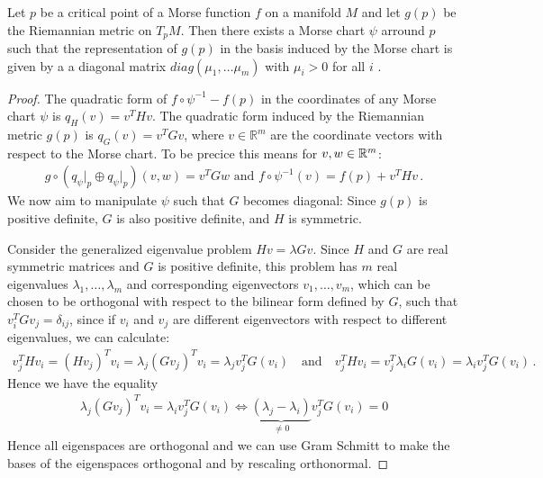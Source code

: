 \begin{theorem}
	Let $p$ be a critical point of a Morse function $f$ on a manifold $M$ and let $g(p)$ be the Riemannian metric on $T_pM$. Then there exists a Morse chart $\psi$ arround $p$ such that the representation of $g(p)$ in the basis induced by the Morse chart is given by a a diagonal matrix $diag(\mu_1,\dots \mu_m)$ with $\mu_i>0$ for all $i$ .
\end{theorem}
\begin{proof}
	The quadratic form of $f \circ \psi^{-1} - f(p)$ in the coordinates of any Morse chart $\psi$ is $q_H(v) = v^T H v$. The quadratic form induced by the Riemannian metric $g(p)$ is $q_G(v) = v^T G v$, where $v \in \mathbb{R}^m$ are the coordinate vectors with respect to the Morse chart. 
	To be precice this means for $v,w\in \mathbb{R}^m$:
	\begin{align*}
		g\circ ( q_{\psi}\big|_p\oplus q_{\psi}\big|_p ) (v,w)=v^TG w \text{ and } f\circ \psi^{-1} (v)=f(p)+v^T H v \, .
	\end{align*} We now aim to manipulate $\psi$ such that $G$ becomes diagonal:
	Since $g(p)$ is positive definite, $G$ is also positive definite, and $H$ is symmetric.
	
	Consider the generalized eigenvalue problem $Hv = \lambda G v$. Since $H$ and $G$ are real symmetric matrices and $G$ is positive definite, this problem has $m$ real eigenvalues $\lambda_1, \dots, \lambda_m$ and corresponding eigenvectors $v_1, \dots, v_m$, which can be chosen to be orthogonal with respect to the bilinear form defined by $G$, such that $v_i^T G v_j = \delta_{ij}$, since if $v_i$ and $v_j$ are different eigenvectors with respect to different eigenvalues, we can calculate:
	 \begin{align*}
	 	v_j^THv_i=(Hv_j)^Tv_i=\lambda _j(Gv_j)^Tv_i=\lambda _j v_j^T G(v_i)  \quad \text{and}\quad 	v_j^THv_i= v_j^T \lambda_i G(v_i)=\lambda_i v_j^TG(v_i) \, .
	 \end{align*} Hence we have the equality
	 \begin{align*}
	 	\lambda _j(Gv_j)^Tv_i=\lambda_i v_j^TG(v_i) \Leftrightarrow \underbrace{(\lambda_j-\lambda_i)}_{\neq 0}v_j^T G(v_i)=0
	 \end{align*} Hence all eigenspaces are orthogonal and we can use Gram Schmitt to make the bases of the eigenspaces orthogonal and by rescaling orthonormal.
	

\end{proof}
